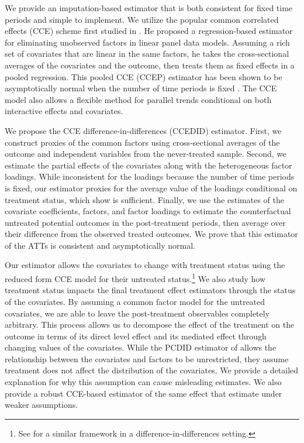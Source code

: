 \documentclass[12pt,fleqn]{article}
\begin{document}
We provide an imputation-based estimator that is both consistent for fixed time periods and simple to implement. We utilize the popular common correlated effects (CCE) scheme first studied in \citet{pesaran2006estimation}. He proposed a regression-based estimator for eliminating unobserved factors in linear panel data models. Assuming a rich set of covariates that are linear in the same factors, he takes the cross-sectional averages of the covariates and the outcome, then treats them as fixed effects in a pooled regression. This pooled CCE (CCEP) estimator has been shown to be asymptotically normal when the number of time periods is fixed \citep{westerlund2019cce,Brown_Schmidt_Wooldridge_2021}. The CCE model also allows a flexible method for parallel trends conditional on both interactive effects and covariates.

We propose the CCE difference-in-differences (CCEDID) estimator. First, we construct proxies of the common factors using cross-sectional averages of the outcome and independent variables from the never-treated sample. Second, we estimate the partial effects of the covariates along with the heterogeneous factor loadings. While inconsistent for the loadings because the number of time periods is fixed, our estimator proxies for the average value of the loadings conditional on treatment status, which \citet{brown2022generalized} show is sufficient. Finally, we use the estimates of the covariate coefficients, factors, and factor loadings to estimate the counterfactual untreated potential outcomes in the post-treatment periods, then average over their difference from the observed treated outcomes. We prove that this estimator of the ATTs is consistent and asymptotically normal. 

Our estimator allows the covariates to change with treatment status using the reduced form CCE model for their untreated status.\footnote{See \citet{Caetano_Callaway_Payne_Rodrigues_2022} for a similar framework in a difference-in-differences setting.}
We also study how treatment status impacts the final treatment effect estimators through the status of the covariates. By assuming a common factor model for the untreated covariates, we are able to leave the post-treatment observables completely arbitrary. This process allows us to decompose the effect of the treatment on the outcome in terms of its direct level effect and its mediated effect through changing values of the covariates. While the PCDID estimator of \citet{chan2022pcdid} allows the relationship between the covariates and factors to be unrestricted, they assume treatment does not affect the distribution of the covariates. We provide a detailed explanation for why this assumption can cause misleading estimates. We also provide a robust CCE-based estimator of the same effect that \citet{chan2022pcdid} estimate under weaker assumptions.
\end{document}
